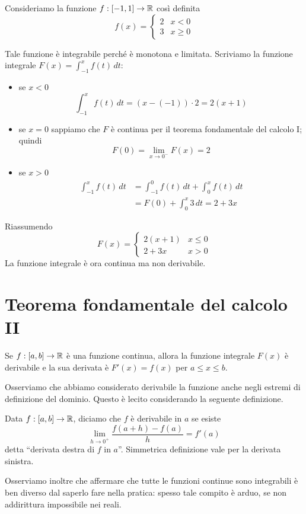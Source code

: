 \begin{example}
Consideriamo la funzione $f: [-1,1] \to \mathbb R$ così definita
\begin{equation*}
f(x) = \begin{cases}
2 & x < 0 \\
3 & x \ge 0
\end{cases}
\end{equation*}

Tale funzione è integrabile perché è monotona e limitata. Scriviamo la funzione integrale $F(x) = \int_{-1}^x f(t) \, dt$:
\begin{itemize}
\item se $x < 0$
\begin{equation*}
\int_{-1}^x f(t) \, dt = (x-(-1)) \cdot 2 = 2(x+1)
\end{equation*}
\item se $x = 0$ sappiamo che $F$ è continua per il teorema fondamentale del calcolo I; quindi
\begin{equation*}
F(0) = \lim_{x \to 0^-} F(x) = 2
\end{equation*}
\item se $x > 0$
\begin{align*}
\int_{-1}^x f(t) \, dt &= \int_{-1}^0 f(t) \, dt + \int_0^x f(t) \, dt \\
&= F(0) + \int_0^x 3 \, dt = 2 + 3x
\end{align*}
\end{itemize}

Riassumendo
\begin{equation*}
F(x) = \begin{cases}
2(x+1) & x \le 0 \\
2+3x & x > 0
\end{cases}
\end{equation*}
La funzione integrale è ora continua ma non derivabile.
\end{example}

\section{Teorema fondamentale del calcolo II}

\begin{theorem}
Se $f:[a,b] \to \mathbb R$ è una funzione continua, allora la funzione integrale $F(x)$ è derivabile e la sua derivata è $F'(x) = f(x)$ per $a \le x \le b$.
\end{theorem}

Osserviamo che abbiamo considerato derivabile la funzione anche negli estremi di definizione del dominio. Questo è lecito considerando la seguente definizione.
\begin{definition}
Data $f:[a,b] \to \mathbb R$, diciamo che $f$ è derivabile in $a$ se esiste
\begin{equation*}
\lim_{h \to 0^+} \frac{f(a+h)-f(a)}{h} = f'(a)
\end{equation*}
detta ``derivata destra di $f$ in $a$''. Simmetrica definizione vale per la derivata sinistra.
\end{definition}

Osserviamo inoltre che affermare che tutte le funzioni continue sono integrabili è ben diverso dal saperlo fare nella pratica: spesso tale compito è arduo, se non addirittura impossibile nei reali.
